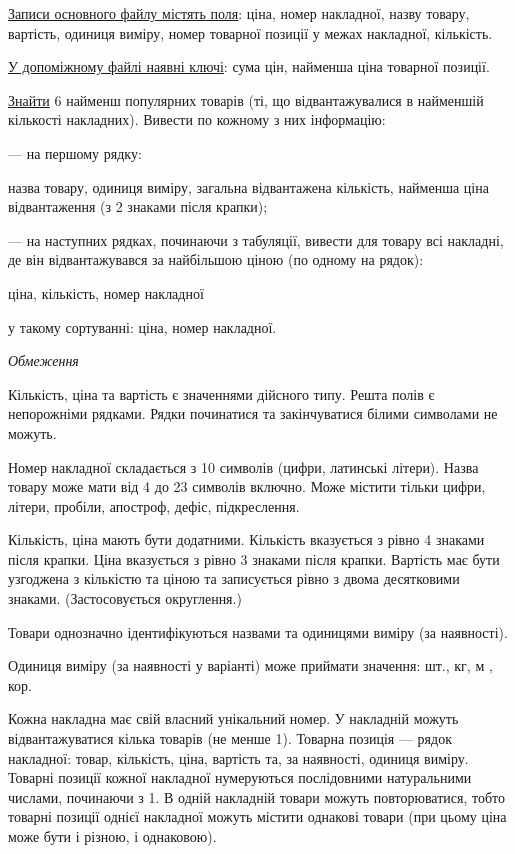 \documentclass[11pt, ukrainian]{article}
\begin{document}
\underline{Записи основного файлу містять поля}: ціна, номер накладної, назву товару, вартість, одиниця виміру, номер товарної позиції у межах накладної, кількість.

\underline{У допоміжному файлі наявні ключі}: сума цін, найменша ціна товарної позиції.

\underline{Знайти} 6 найменш популярних товарів (ті, що відвантажувалися в найменшій кількості накладних). Вивести по кожному з них інформацію:\par
{\noindent}--- на першому рядку:\par
назва товару, одиниця виміру, загальна відвантажена кількість, найменша ціна відвантаження (з 2 знаками після крапки);

{\noindent}--- на наступних рядках, починаючи з табуляції, вивести для товару всі накладні, де він відвантажувався за найбільшою ціною (по одному на рядок):\par
ціна, кількість, номер накладної

{\noindent}у такому сортуванні: ціна, номер накладної.


\bigskip\textit{Обмеження}

Кількість, ціна та вартість є значеннями дійсного типу.
Решта полів є непорожніми рядками.
Рядки починатися та закінчуватися білими символами не можуть.

Номер накладної складається з 10 символів (цифри, латинські літери).
Назва товару може мати від 4 до 23 символів включно.
Може містити тільки цифри, літери, пробіли, апостроф, дефіс, підкреслення.

Кількість, ціна мають бути додатними.
Кількість вказується з рівно 4 знаками після крапки.
Ціна вказується з рівно 3 знаками після крапки.
Вартість має бути узгоджена з кількістю та ціною та записується рівно з двома десятковими знаками.
(Застосовується округлення.)

Товари однозначно ідентифікуються назвами та одиницями виміру (за наявності).

Одиниця виміру (за наявності у варіанті) може приймати значення: шт., кг, м , кор.

Кожна накладна має свій власний унікальний номер.
У накладній можуть відвантажуватися кілька товарів (не менше 1).
Товарна позиція --- рядок накладної: товар, кількість, ціна, вартість та, за наявності, одиниця виміру.
Товарні позиції кожної накладної нумеруються послідовними натуральними числами, починаючи з 1.
В одній накладній товари можуть повторюватися, 
тобто товарні позиції однієї накладної можуть містити однакові товари 
(при цьому ціна може бути і різною, і однаковою).
\end{document}
